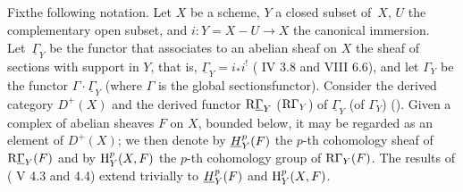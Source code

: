 \subsection{\texorpdfstring{}{XIV.1.0}}\label{XIV.1.0}
Fix\pageoriginale the following notation. Let $X$ be a scheme, $Y$ a closed subset of~$X$, $U$ the complementary open subset, and $i:Y=X-U\to X$ the canonical immersion. Let~$\underline{\Gamma}_Y$ be the functor that associates to an abelian sheaf on $X$ the \og sheaf of sections with support in $Y$\fg, that is, $\underline{\Gamma}_Y=i_*i^!$ (\cf {} IV 3.8 and VIII 6.6), and let $\Gamma_Y$ be the functor $\Gamma\cdot \underline{\Gamma}_Y$ (where $\Gamma$ is the \og global sections\fg functor). Consider the derived category $D^+(X)$ and the derived functor $\mathrm R\underline{\Gamma}_Y$ (\resp $\mathrm R\Gamma_Y$) of $\underline{\Gamma}_Y$ (\resp of $\Gamma_Y$) (\cf \cite{XIV.3}). Given a complex of abelian sheaves $F$ on $X$, bounded below, it may be regarded as an element of $D^+(X)$; we then denote by ${\mathop{\underline{H}}\nolimits}_Y^p(F)$ the $p$-th cohomology sheaf of $\mathrm R\underline{\Gamma}_Y(F)$ and by $\mathrm H_Y^p(X, F)$ the $p$-th cohomology group of $\mathrm R\Gamma_Y(F)$. The results of ( V 4.3 and 4.4) extend trivially to ${\mathop{\underline{H}}\nolimits}_Y^p(F)$ and $\mathrm H_Y^p(X, F)$.

